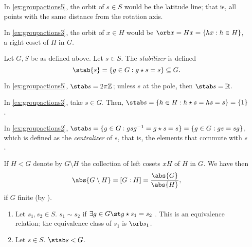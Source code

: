 \documentclass[12pt,oneside]{article}
\begin{document}
\begin{remark}
  In \cref{ex:groupactions5}, the orbit of $s\in S$ would be the latitude line; that is, all points with the same distance from the rotation axis.

  In \cref{ex:groupactions3}, the orbit of $x \in H$ would be $\orb x = Hx = \{hx : h \in H\}$, a right coset of $H$ in $G$.
\end{remark}

\begin{definition}[Stabilizer]
  Let $G, S$ be as defined above. Let $s \in S$. The \emph{stabilizer} is defined \[
  \stab{s} = \{g \in G : g \star s = s\}  \subseteq G.
  \]
\end{definition}

\begin{remark}
  In \cref{ex:groupactions5}, $\stab s = 2 \pi \mathbb{Z}$; unless $s$ at the pole, then $\stab s = \mathbb{R}$.

  In \cref{ex:groupactions3}, take $s \in G$. Then, $\stab s = \{h \in H : h \star s = hs = s\} = \{1\}$.

  In \cref{ex:groupactions2}, $\stab s = \{g \in G : gsg^{-1} = g \star s = s\} = \{g \in G : gs = sg\}$, which is defined as the \emph{centralizer} of $s$, that is, the elements that commute with $s$.
\end{remark}

\begin{definition}\label{def:collectionofcosets}
  If $H < G$ denote by $G \setminus H$ the collection of left cosets $xH$ of $H$ in $G$. We have then\[
  \abs{G \setminus H} = [G : H] = \frac{\abs{G}}{\abs{H}},
  \]
  if $G$ finite (by ).
\end{definition}
\begin{lemma}
  \begin{enumerate}
    \item Let $s_1, s_2 \in S$. $s_1 \sim s_2$ if $\exists g \in G \st g \star s_1 = s_2$ . This is an equivalence relation; the equivalence class of $s_1$ is $\orb s_1$.
    \item Let $s \in S$. $\stab s < G$.
  \end{enumerate}
\end{lemma}
\end{document}
